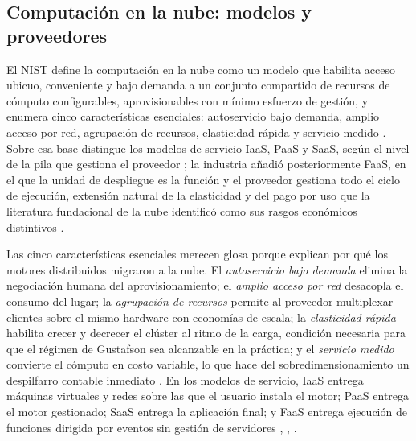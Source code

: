 \documentclass[10pt,journal]{IEEEtran}
\begin{document}
\subsection{Computaci\'on en la nube: modelos y proveedores}
\label{sec:nube}
El NIST define la computaci\'on en la nube como un modelo que habilita acceso
ubicuo, conveniente y bajo demanda a un conjunto compartido de recursos de
c\'omputo configurables, aprovisionables con m\'inimo esfuerzo de gesti\'on, y
enumera cinco caracter\'isticas esenciales: autoservicio bajo demanda, amplio
acceso por red, agrupaci\'on de recursos, elasticidad r\'apida y servicio medido
\cite{mell2011}. Sobre esa base distingue los modelos de servicio IaaS, PaaS y
SaaS, seg\'un el nivel de la pila que gestiona el proveedor \cite{mell2011}; la
industria a\~nadi\'o posteriormente FaaS, en el que la unidad de despliegue es
la funci\'on y el proveedor gestiona todo el ciclo de ejecuci\'on, extensi\'on
natural de la elasticidad y del pago por uso que la literatura fundacional de
la nube identific\'o como sus rasgos econ\'omicos distintivos
\cite{armbrust2010}.

Las cinco caracter\'isticas esenciales merecen glosa porque explican por qu\'e
los motores distribuidos migraron a la nube. El \emph{autoservicio bajo
demanda} elimina la negociaci\'on humana del aprovisionamiento; el \emph{amplio
acceso por red} desacopla el consumo del lugar; la \emph{agrupaci\'on de
recursos} permite al proveedor multiplexar clientes sobre el mismo hardware con
econom\'ias de escala; la \emph{elasticidad r\'apida} habilita crecer y
decrecer el cl\'uster al ritmo de la carga, condici\'on necesaria para que el
r\'egimen de Gustafson sea alcanzable en la pr\'actica; y el \emph{servicio
medido} convierte el c\'omputo en costo variable, lo que hace del
sobredimensionamiento un despilfarro contable inmediato \cite{mell2011}. En los
modelos de servicio, IaaS entrega m\'aquinas virtuales y redes sobre las que el
usuario instala el motor; PaaS entrega el motor gestionado; SaaS entrega la
aplicaci\'on final; y FaaS entrega ejecuci\'on de funciones dirigida por
eventos sin gesti\'on de servidores \cite{mell2011}, \cite{burns2024},
\cite{armbrust2010}.
\end{document}
